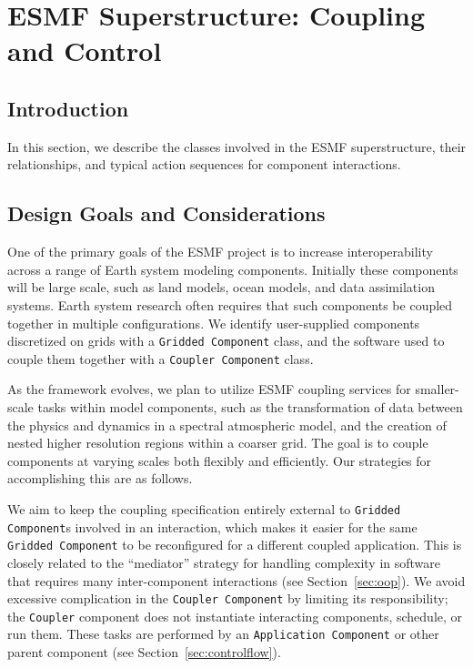 \section{ESMF Superstructure:  Coupling and Control}
\label{sec:superclasses}

\subsection{Introduction}

In this section, we describe the classes involved in the ESMF superstructure, 
their relationships, and typical action sequences for component interactions.

\subsection{Design Goals and Considerations}

One of the primary goals of the ESMF project is to increase interoperability
across a range of Earth system modeling components.  Initially these 
components will be large scale, such as land models, ocean models, 
and data assimilation systems.  Earth system research 
often requires that such components be coupled together in multiple
configurations.  We identify user-supplied components discretized on grids with 
a {\tt Gridded Component} class, and the software used to couple them together
with a {\tt Coupler Component} class.  

As the framework evolves, we plan to utilize ESMF coupling services for 
smaller-scale tasks within model components, such as the transformation of 
data between the 
physics and dynamics in a spectral atmospheric model, and the creation 
of nested higher resolution regions within a coarser grid.  The goal is 
to couple components at varying scales both flexibly and efficiently.  
Our strategies for accomplishing this are as follows.

We aim to keep the coupling specification entirely external 
to {\tt Gridded Component}s involved in an interaction, which makes it easier 
for the same {\tt Gridded Component} to be reconfigured for a different 
coupled application.
This is closely related to the ``mediator'' strategy for handling complexity in 
software that requires many inter-component interactions (see Section~\ref{sec:oop}).  
We avoid excessive complication in the {\tt Coupler Component} by limiting
its responsibility; the {\tt Coupler} component does not instantiate 
interacting components, schedule, or run them.  These tasks are performed
by an {\tt Application Component} or other parent component (see 
Section~\ref{sec:controlflow}).

